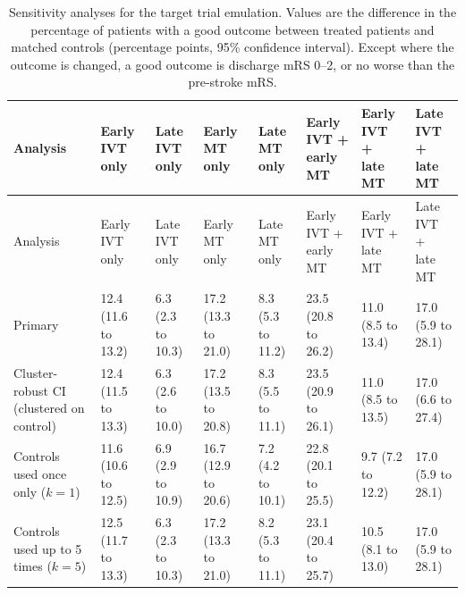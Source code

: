 \begin{landscape}
{
\scriptsize
\begin{longtable}[]{@{}llllllll@{}}
\caption{Sensitivity analyses for the target trial emulation. Values are the difference in the percentage of patients with a good outcome between treated patients and matched controls (percentage points, 95\% confidence interval). Except where the outcome is changed, a good outcome is discharge mRS 0--2, or no worse than the pre-stroke mRS.}
\label{tab:sens_tte}\\
\toprule
Analysis & \makecell[l]{Early IVT\\only} & \makecell[l]{Late IVT\\only} & \makecell[l]{Early MT\\only} & \makecell[l]{Late MT\\only} & \makecell[l]{Early IVT +\\early MT} & \makecell[l]{Early IVT +\\late MT} & \makecell[l]{Late IVT +\\late MT} \\
\midrule
\endfirsthead
\toprule
Analysis & \makecell[l]{Early IVT\\only} & \makecell[l]{Late IVT\\only} & \makecell[l]{Early MT\\only} & \makecell[l]{Late MT\\only} & \makecell[l]{Early IVT +\\early MT} & \makecell[l]{Early IVT +\\late MT} & \makecell[l]{Late IVT +\\late MT} \\
\midrule
\endhead
\bottomrule
\endlastfoot
Primary & 12.4 (11.6 to 13.2) & 6.3 (2.3 to 10.3) & 17.2 (13.3 to 21.0) & 8.3 (5.3 to 11.2) & 23.5 (20.8 to 26.2) & 11.0 (8.5 to 13.4) & 17.0 (5.9 to 28.1) \\
Cluster-robust CI (clustered on control) & 12.4 (11.5 to 13.3) & 6.3 (2.6 to 10.0) & 17.2 (13.5 to 20.8) & 8.3 (5.5 to 11.1) & 23.5 (20.9 to 26.1) & 11.0 (8.5 to 13.5) & 17.0 (6.6 to 27.4) \\
Controls used once only ($k=1$) & 11.6 (10.6 to 12.5) & 6.9 (2.9 to 10.9) & 16.7 (12.9 to 20.6) & 7.2 (4.2 to 10.1) & 22.8 (20.1 to 25.5) & 9.7 (7.2 to 12.2) & 17.0 (5.9 to 28.1) \\
Controls used up to 5 times ($k=5$) & 12.5 (11.7 to 13.3) & 6.3 (2.3 to 10.3) & 17.2 (13.3 to 21.0) & 8.2 (5.3 to 11.1) & 23.1 (20.4 to 25.7) & 10.5 (8.1 to 13.0) & 17.0 (5.9 to 28.1) \\

\end{longtable}}
\end{landscape}
